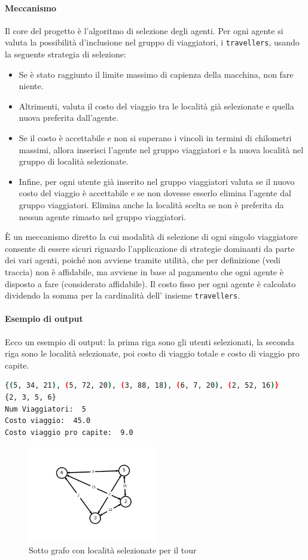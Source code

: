 \documentclass{article}
\begin{document}
\paragraph*{Meccanismo}
Il core del progetto è l'algoritmo di selezione degli agenti. Per ogni agente si valuta la possibilità d'inclusione nel gruppo di viaggiatori, i \verb|travellers|, usando la seguente strategia di selezione:
\begin{itemize}
  \item Se è stato raggiunto il limite massimo di capienza della macchina, non fare niente.
  \item Altrimenti, valuta il costo del viaggio tra le località già selezionate e quella nuova preferita dall'agente.
  \item Se il costo è accettabile e non si superano i vincoli in termini di chilometri massimi, allora inserisci l'agente nel gruppo viaggiatori e la nuova località nel gruppo di località selezionate.
  \item Infine, per ogni utente già inserito nel gruppo viaggiatori valuta se il nuovo costo del viaggio è accettabile e se non dovesse esserlo elimina l'agente dal gruppo viaggiatori. Elimina anche la località scelta se non è preferita da nessun agente rimasto nel gruppo viaggiatori.
\end{itemize}
È un meccanismo diretto la cui modalità di selezione di ogni singolo viaggiatore consente di essere sicuri riguardo l'applicazione di strategie dominanti da parte dei vari agenti, poiché non avviene tramite utilità, che per definizione (vedi traccia) non è affidabile, ma avviene in base al pagamento che ogni agente è disposto a fare (considerato affidabile).
Il costo fisso per ogni agente è calcolato dividendo la somma per la cardinalità dell' insieme \verb|travellers|.
\paragraph*{Esempio di output}
Ecco un esempio di output: la prima riga sono gli utenti selezionati, la seconda riga sono le località selezionate, poi costo di viaggio totale e costo di viaggio pro capite.
\begin{lstlisting}[language=bash]
{(5, 34, 21), (5, 72, 20), (3, 88, 18), (6, 7, 20), (2, 52, 16)}
{2, 3, 5, 6}
Num Viaggiatori:  5
Costo viaggio:  45.0
Costo viaggio pro capite:  9.0
\end{lstlisting}

\begin{figure}[h]
  \centering
  \includegraphics[width=0.50\textwidth]{img/graphOutput.png}
  \caption{Sotto grafo con località selezionate per il tour}\label{fig:graphOutput.png}
\end{figure}
\clearpage
\pagebreak
\end{document}
